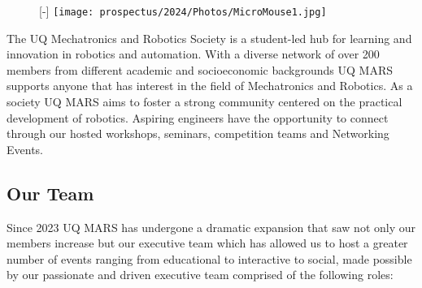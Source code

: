 \documentclass[a4paper,12pt]{report}
\begin{document}
\begin{figure}
\raisebox{0pt}[\dimexpr\height-\baselineskip\relax]{
    \texttt{[image: prospectus/2024/Photos/MicroMouse1.jpg]}
}
\end{figure}

The UQ Mechatronics and Robotics Society is a student-led hub for learning and innovation in robotics and automation.
With a diverse network of over 200 members from different academic and socioeconomic backgrounds UQ MARS supports anyone that has interest in the field of Mechatronics and Robotics. As a society UQ MARS aims to foster a strong community centered on the practical development of robotics.
Aspiring engineers have the opportunity to connect through our hosted workshops, seminars, competition teams and Networking Events.

\vspace{-1.5cm}

\subsection{Our Team}

Since 2023 UQ MARS has undergone a dramatic expansion that saw not only our members increase but our executive team which has allowed us to host a greater number of events ranging from educational to interactive to social, made possible by our passionate and driven executive team comprised of the following roles:
\end{document}
